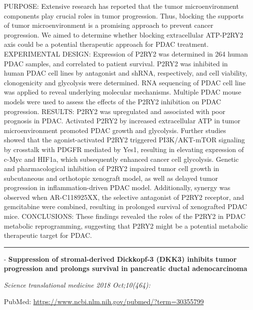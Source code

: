 \documentclass[]{article}
\begin{document}
PURPOSE: Extensive research has reported that the tumor microenvironment
components play crucial roles in tumor progression. Thus, blocking the
supports of tumor microenvironment is a promising approach to prevent
cancer progression. We aimed to determine whether blocking extracellular
ATP-P2RY2 axis could be a potential therapeutic approach for PDAC
treatment. EXPERIMENTAL DESIGN: Expression of P2RY2 was determined in
264 human PDAC samples, and correlated to patient survival. P2RY2 was
inhibited in human PDAC cell lines by antagonist and shRNA,
respectively, and cell viability, clonogenicity and glycolysis were
determined. RNA sequencing of PDAC cell line was applied to reveal
underlying molecular mechanisms. Multiple PDAC mouse models were used to
assess the effects of the P2RY2 inhibition on PDAC progression. RESULTS:
P2RY2 was upregulated and associated with poor prognosis in PDAC.
Activated P2RY2 by increased extracellular ATP in tumor microenvironment
promoted PDAC growth and glycolysis. Further studies showed that the
agonist-activated P2RY2 triggered PI3K/AKT-mTOR signaling by crosstalk
with PDGFR mediated by Yes1, resulting in elevating expression of c-Myc
and HIF1a, which subsequently enhanced cancer cell glycolysis. Genetic
and pharmacological inhibition of P2RY2 impaired tumor cell growth in
subcutaneous and orthotopic xenograft model, as well as delayed tumor
progression in inflammation-driven PDAC model. Additionally, synergy was
observed when AR-C118925XX, the selective antagonist of P2RY2 receptor,
and gemcitabine were combined, resulting in prolonged survival of
xenografted PDAC mice. CONCLUSIONS: These findings revealed the roles of
the P2RY2 in PDAC metabolic reprogramming, suggesting that P2RY2 might
be a potential metabolic therapeutic target for PDAC.

{}

{}

\begin{center}\rule{0.5\linewidth}{\linethickness}\end{center}

 - \textbf{Suppression of stromal-derived Dickkopf-3 (DKK3) inhibits
tumor progression and prolongs survival in pancreatic ductal
adenocarcinoma}

\emph{Science translational medicine 2018 Oct;10(464):}

PubMed: \url{https://www.ncbi.nlm.nih.gov/pubmed/?term=30355799}
\end{document}
